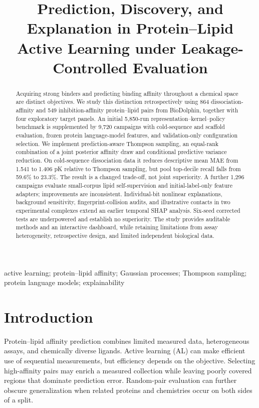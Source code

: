 \documentclass[wcp]{jmlr}
\title[Prediction and Discovery in LipidAL]{Prediction, Discovery, and Explanation in Protein--Lipid Active Learning under Leakage-Controlled Evaluation}
\author{}
\begin{document}
\makeatletter\let\@jmlrpages\@empty\makeatother
\maketitle
\begin{abstract}
Acquiring strong binders and predicting binding affinity throughout a chemical
space are distinct objectives. We study this distinction retrospectively using
864 dissociation-affinity and 549 inhibition-affinity protein--lipid pairs from
BioDolphin, together with four exploratory target panels. An initial 5,850-run
representation--kernel--policy benchmark is supplemented by 9,720 campaigns
with cold-sequence and scaffold evaluation, frozen protein language-model
features, and validation-only configuration selection. We implement
prediction-aware Thompson sampling, an equal-rank combination of a joint
posterior affinity draw and conditional predictive variance reduction.
On cold-sequence dissociation data it reduces descriptive mean MAE from
1.541 to 1.406 pK relative to Thompson sampling, but pool top-decile recall
falls from 59.6\% to 23.3\%. The result is a changed trade-off, not joint
superiority. A further 1,296 campaigns evaluate small-corpus lipid
self-supervision and initial-label-only feature adapters; improvements are
inconsistent. Individual-bit nonlinear explanations, background sensitivity,
fingerprint-collision audits, and illustrative contacts in two experimental
complexes extend an earlier temporal SHAP analysis. Six-seed corrected tests
are underpowered and establish no superiority. The study provides auditable
methods and an interactive dashboard, while retaining limitations from assay
heterogeneity, retrospective design, and limited independent biological data.
\end{abstract}
\begin{keywords}
active learning; protein--lipid affinity; Gaussian processes; Thompson sampling;
protein language models; explainability
\end{keywords}

\section{Introduction}
Protein--lipid affinity prediction combines limited measured data, heterogeneous
assays, and chemically diverse ligands. Active learning (AL) can make efficient
use of sequential measurements, but efficiency depends on the objective.
Selecting high-affinity pairs may enrich a measured collection while leaving
poorly covered regions that dominate prediction error. Random-pair evaluation
can further obscure generalization when related proteins and chemistries occur
on both sides of a split.
\end{document}
